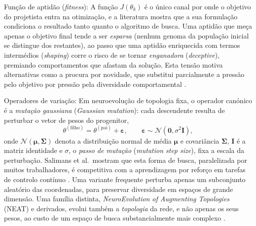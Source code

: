 \documentclass[12pt,reqno, twoside]{amsbook}
\makeatletter
\def\paragraph{\@startsection{paragraph}{4}%
  \z@\z@{-\fontdimen2\font}%
  {\normalfont\bfseries}}
\theoremstyle{plain}
\numberwithin{equation}{chapter}
\numberwithin{section}{chapter}
\numberwithin{table}{chapter}
\numberwithin{figure}{chapter}
\makeatother
\begin{document}
\paragraph{Função de aptidão (\textit{fitness}):}
A função $J(\theta_k)$ é o único canal por onde o objetivo do projetista entra na otimização, e a literatura mostra que a sua formulação condiciona o resultado tanto quanto o algoritmo de busca. Uma aptidão que meça apenas o objetivo final tende a ser \emph{esparsa} (nenhum genoma da população inicial se distingue dos restantes), ao passo que uma aptidão enriquecida com termos intermédios (\textit{shaping}) corre o risco de se tornar \emph{enganadora} (\textit{deceptive}), premiando comportamentos que afastam da solução. Esta tensão motiva alternativas como a procura por novidade, que substitui parcialmente a pressão pelo objetivo por pressão pela diversidade comportamental \cite{lehman2011abandoning, hasselmann2023novelty}.

\paragraph{Operadores de variação:}
Em neuroevolução de topologia fixa, o operador canónico é a \emph{mutação gaussiana} (\textit{Gaussian mutation}): cada descendente resulta de perturbar o vetor de pesos do progenitor,
\begin{equation}
    \theta^{(\text{filho})} = \theta^{(\text{pai})} + \boldsymbol{\varepsilon}, \qquad \boldsymbol{\varepsilon} \sim \mathcal{N}(\mathbf{0}, \sigma^2 \mathbf{I}),
    \label{eq:mutacao_gaussiana}
\end{equation}
onde $\mathcal{N}(\boldsymbol{\mu}, \boldsymbol{\Sigma})$ denota a distribuição normal de média $\boldsymbol{\mu}$ e covariância $\boldsymbol{\Sigma}$, $\mathbf{I}$ é a matriz identidade e $\sigma$, o \emph{passo de mutação} (\textit{mutation step size}), fixa a escala da perturbação. Salimans et al.\ mostram que esta forma de busca, paralelizada por muitos trabalhadores, é competitiva com a aprendizagem por reforço em tarefas de controlo contínuo \cite{salimans2017es}. Uma variante frequente perturba apenas um subconjunto aleatório das coordenadas, para preservar diversidade em espaços de grande dimensão. Uma família distinta, \textit{NeuroEvolution of Augmenting Topologies} (NEAT) e derivados, evolui também a \emph{topologia} da rede, e não apenas os seus pesos, ao custo de um espaço de busca substancialmente mais complexo \cite{zaman2025neat, biteng2025training}.
\end{document}
